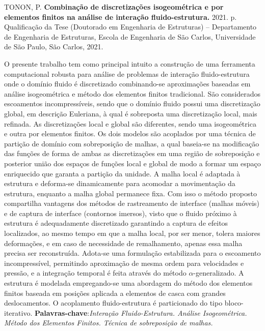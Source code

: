 \documentclass[
	12pt,		
	openright,
	twoside,	
	a4paper,			
	english,	
	french,		
	spanish,		
	brazil				
	]{abntex2}
\begin{document}
\begin{SingleSpace}
\begin{resumo}[Resumo]
	\begin{flushleft}
		TONON, P. \textbf{Combinação de discretizações isogeométrica e por elementos finitos na análise de interação fluido-estrutura.} 2021. \pageref{LastPage} p. Qualifica\c{c}\~ao da Tese (Doutorado em Engenharia de Estruturas) – Departamento de Engenharia de Estruturas, Escola de Engenharia de São Carlos, Universidade de São Paulo, São Carlos, 2021.\newline 
	\end{flushleft}
	\noindent
	O presente trabalho tem como principal intuito a construção de uma ferramenta computacional robusta para análise de problemas de interação fluido-estrutura onde o domínio fluido é discretizado combinando-se aproximações baseadas em análise isogeométrica e método dos elementos finitos tradicional. 
	São considerados escoamentos incompressíveis, sendo que o domínio fluido possui uma discretização global, em descrição Euleriana, à qual é sobreposta uma discretização local, mais refinada. As discretizações local e global são diferentes, sendo uma isogeométrica e outra por elementos finitos. Os dois modelos são acoplados por uma técnica de partição de domínio com sobreposição de malhas, a qual baseia-se na modificação das funções de forma de ambas as discretizações em uma região de sobreposição e posterior união dos espaços de funções local e global de modo a formar um espaço enriquecido que garanta a partição da unidade. A malha local é adaptada à estrutura e deforma-se dinamicamente para acomodar a movimentação da estrutura, enquanto a malha global permanece fixa. Com isso o método proposto compartilha vantagens dos métodos de rastreamento de interface (malhas móveis) e de captura de interface (contornos imersos), visto que o fluido próximo à estrutura é adequadamente discretizado garantindo a captura de efeitos localizados, ao mesmo tempo em que a malha local, por ser menor, tolera maiores deformações, e em caso de necessidade de remalhamento, apenas essa malha precisa ser reconstruída. Adota-se uma formulação estabilizada para o escoamento incompressível, permitindo aproximação de mesma ordem para velocidades e pressão, e a integração temporal é feita através do método $\alpha$-generalizado. A estrutura é modelada empregando-se uma abordagem do método dos elementos finitos baseada em posições aplicada a elementos de casca com grandes deslocamentos. O acoplamento fluido-estrutura é particionado do tipo bloco-iterativo. 
	\newline \newline
  	\textbf{Palavras-chave}:\textit{Interação Fluido-Estrutura.  Análise Isogeométrica. Método dos Elementos Finitos. Técnica de sobreposição de malhas.}  \cleardoublepage
\end{resumo}
\end{SingleSpace}
\end{document}
